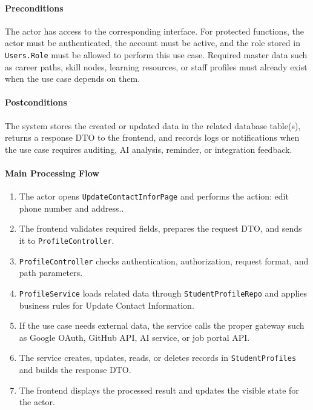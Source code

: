 \paragraph{Preconditions}

The actor has access to the corresponding interface. For protected functions, the actor must be authenticated, the account must be active, and the role stored in \texttt{Users.Role} must be allowed to perform this use case. Required master data such as career paths, skill nodes, learning resources, or staff profiles must already exist when the use case depends on them.

\paragraph{Postconditions}

The system stores the created or updated data in the related database table(s), returns a response DTO to the frontend, and records logs or notifications when the use case requires auditing, AI analysis, reminder, or integration feedback.

\paragraph{Main Processing Flow}

\begin{enumerate}
    \item The actor opens \texttt{UpdateContactInforPage} and performs the action: edit phone number and address..
    \item The frontend validates required fields, prepares the request DTO, and sends it to \texttt{ProfileController}.
    \item \texttt{ProfileController} checks authentication, authorization, request format, and path parameters.
    \item \texttt{ProfileService} loads related data through \texttt{StudentProfileRepo} and applies business rules for Update Contact Information.
    \item If the use case needs external data, the service calls the proper gateway such as Google OAuth, GitHub API, AI service, or job portal API.
    \item The service creates, updates, reads, or deletes records in \texttt{StudentProfiles} and builds the response DTO.
    \item The frontend displays the processed result and updates the visible state for the actor.
\end{enumerate}

